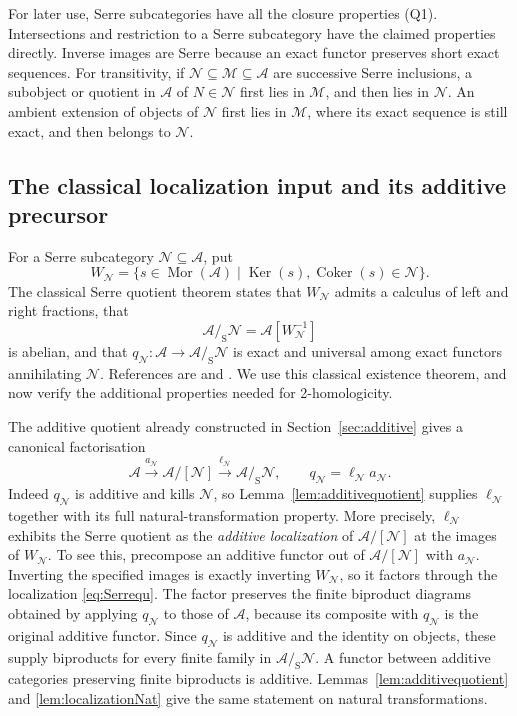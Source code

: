 \documentclass[11pt,reqno,a4paper]{amsart}
\theoremstyle{definition}
\theoremstyle{remark}
\newcommand{\A}{\mathcal{A}}
\newcommand{\M}{\mathcal{M}}
\newcommand{\N}{\mathcal{N}}
\newcommand{\0}{\mathbf{0}}
\renewcommand{\1}{\mathbf{1}}
\newcommand{\aq}[2]{#1/[#2]}
\newcommand{\sq}[2]{#1/_{\!\mathrm S}#2}
\DeclareMathOperator{\Mor}{Mor}
\DeclareMathOperator{\Ker}{Ker}
\DeclareMathOperator{\Coker}{Coker}
\begin{document}
For later use, Serre subcategories have all the closure properties (Q1).
Intersections and restriction to a Serre subcategory have the claimed
properties directly. Inverse images are Serre because an exact functor
preserves short exact sequences. For transitivity, if
$\N\subseteq\M\subseteq\A$ are successive Serre inclusions, a
subobject or quotient in $\A$ of $N\in\N$ first lies in $\M$,
and then lies in $\N$. An ambient extension of objects of $\N$
first lies in $\M$, where its exact sequence is still exact, and
then belongs to $\N$.

\subsection{The classical localization input and its additive precursor}

For a Serre subcategory $\N\subseteq\A$, put
\begin{equation}\label{eq:SerreW}
 W_{\N}=\{s\in\Mor(\A)\mid\Ker(s),\Coker(s)\in\N\}.
\end{equation}
The classical Serre quotient theorem states that $W_{\N}$ admits a
calculus of left and right fractions, that
\begin{equation}\label{eq:Serrequ}
 \sq{\A}{\N}=\A[W_{\N}^{-1}]
\end{equation}
is abelian, and that $q_{\N}:\A\to\sq{\A}{\N}$ is exact and
universal among exact functors annihilating $\N$. References are
\cite[Chapter III, Section 1]{Gabriel} and
\cite[Lemma 12.10.6, Tag 02MS]{StacksSerreQuotient}.
We use this classical existence theorem, and now verify the additional
properties needed for 2-homologicity.

The additive quotient already constructed in Section~\ref{sec:additive}
gives a canonical factorisation
\begin{equation}\label{eq:Serreadditivefactor}
 \A\xrightarrow{a_{\N}}\aq{\A}{\N}
 \xrightarrow{\ell_{\N}}\sq{\A}{\N},
 \qquad q_{\N}=\ell_{\N}a_{\N}.
\end{equation}
Indeed $q_{\N}$ is additive and kills $\N$, so
Lemma~\ref{lem:additivequotient} supplies $\ell_{\N}$ together with
its full natural-transformation property. More precisely,
$\ell_{\N}$ exhibits the Serre quotient as the \emph{additive
localization} of $\aq{\A}{\N}$ at the images of $W_{\N}$.
To see this, precompose an additive functor out of $\aq{\A}{\N}$
with $a_{\N}$. Inverting the specified images is exactly inverting
$W_{\N}$, so it factors through the localization
\eqref{eq:Serrequ}. The factor preserves the finite biproduct
diagrams obtained by applying $q_{\N}$ to those of $\A$, because
its composite with $q_{\N}$ is the original additive functor.
Since $q_{\N}$ is additive and the identity on objects, these
supply biproducts for every finite family in $\sq{\A}{\N}$.
A functor between additive categories preserving finite biproducts
is additive. Lemmas~\ref{lem:additivequotient} and
\ref{lem:localizationNat} give the same statement on natural
transformations.
\end{document}
